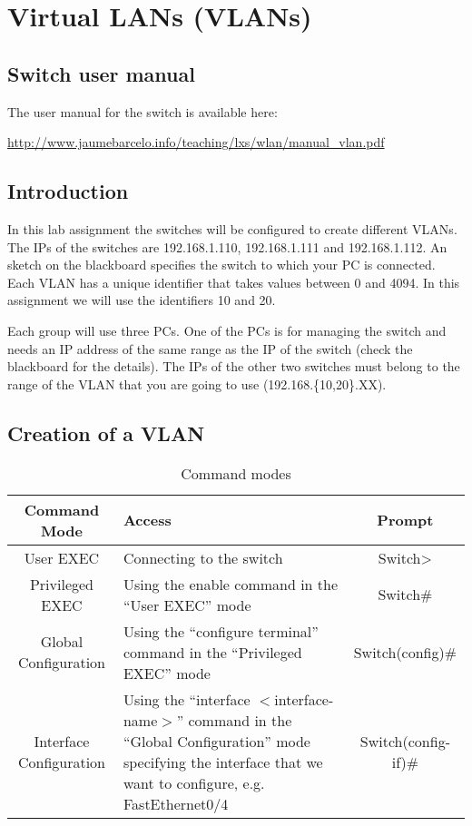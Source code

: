 \chapter{Virtual LANs (VLANs)}

\section{Switch user manual}

The user manual for the switch is available here:

\url{http://www.jaumebarcelo.info/teaching/lxs/wlan/manual_vlan.pdf}


\section{Introduction}

In this lab assignment the switches will be configured to create different VLANs.
The IPs of the switches are 192.168.1.110, 192.168.1.111 and 192.168.1.112.
An sketch on the blackboard specifies the switch to which your PC is connected.
Each VLAN has a unique identifier that takes values between 0 and 4094.
In this assignment we will use the identifiers 10 and 20.


Each group will use three PCs.
One of the PCs is for managing the switch and needs an IP address of the same range as the IP of the switch (check the blackboard for the details).
The IPs of the other two switches must belong to the range of the VLAN that you are going to use (192.168.\{10,20\}.XX).


\section{Creation of a VLAN}

\begin{table}[!t]
\renewcommand{\arraystretch}{1.3}
\caption{Command modes}
\label{tab:modes}
\centering
\begin{tabular}{|c|p{5cm}|c|}
\hline
Command Mode & Access & Prompt\\
\hline
User EXEC & Connecting to the switch & Switch> \\
Privileged EXEC & Using the enable command in the ``User EXEC'' mode & Switch\# \\
Global Configuration & Using the ``configure terminal'' command in the ``Privileged EXEC'' mode& Switch(config)\# \\
        Interface Configuration & Using the ``interface $<$interface-name$>$'' command in the ``Global Configuration'' mode specifying the interface that we want to configure, e.g. FastEthernet0/4& Switch(config-if)\# \\
\hline
\end{tabular}
\end{table}



